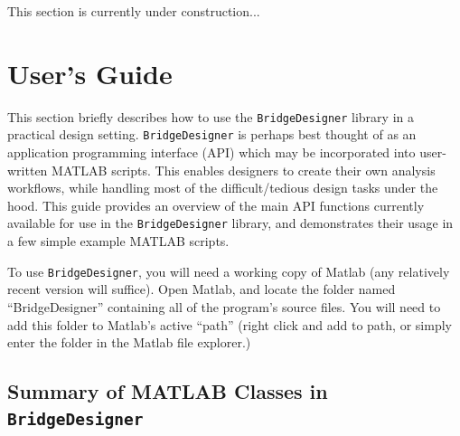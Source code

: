 \documentclass[12pt,a4paper,article]{memoir} %
\begin{document}
This section is currently under construction...

\newpage

\chapter{User's Guide} \label{sec:usage}

This section briefly describes how to use the \texttt{BridgeDesigner} library in a practical design setting. \texttt{BridgeDesigner} is perhaps best thought of as an application programming interface (API) which may be incorporated into user-written MATLAB scripts. This enables designers to create their own analysis workflows, while handling most of the difficult/tedious design tasks under the hood. This guide provides an overview of the main API functions currently available for use in the \texttt{BridgeDesigner} library, and demonstrates their usage in a few simple example MATLAB scripts.

To use \texttt{BridgeDesigner}, you will need a working copy of Matlab (any relatively recent version will suffice). Open Matlab, and locate the folder named ``BridgeDesigner'' containing all of the program's source files. You will need to add this folder to Matlab's active ``path'' (right click and add to path, or simply enter the folder in the Matlab file explorer.)

\section{Summary of MATLAB Classes in \texttt{BridgeDesigner}}
\end{document}
